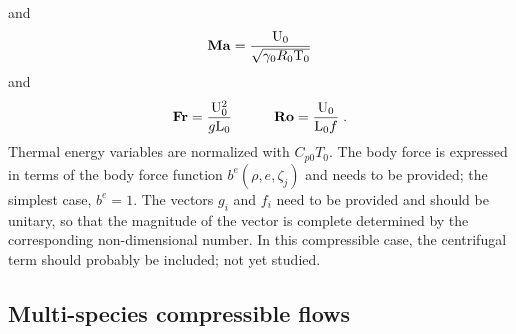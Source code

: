 and
\begin{equation*}
  \mathrm{\bf Ma}  = \frac{\mathrm{U}_0}{\sqrt{\gamma_0 R_0 \mathrm{T}_0}}
\end{equation*}
and
\begin{alignat*}{2}
  \mathrm{\bf Fr} & = \frac{\mathrm{U}_0^2}{g\mathrm{L}_0} & \qquad \mathrm{\bf Ro} = \frac{\mathrm{U}_0}{\mathrm{L}_0f} \;.
\end{alignat*}
Thermal energy variables are normalized with $C_{p0}T_0$. The body force is expressed in terms of the body force function $b^e(\rho,e,\zeta_j)$ and needs to be provided; the simplest case, $b^e=1$. The vectors $g_i$ and $f_i$ need to be provided and should be unitary, so that the magnitude of the vector is complete determined by the corresponding non-dimensional number. In this compressible case, the centrifugal term should probably be included; not yet studied.

\subsection{Multi-species compressible flows}


